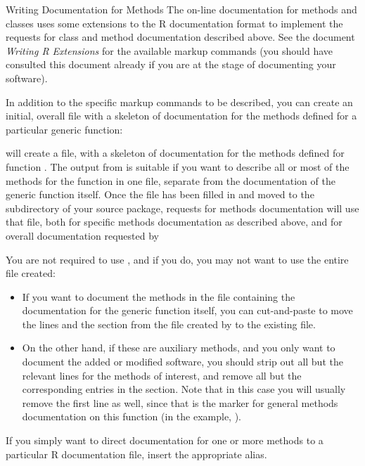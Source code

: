 \begin{Section}{Writing Documentation for Methods}
The on-line documentation for methods and classes uses some extensions
to the R documentation format to implement the requests for class and
method documentation described above.  See the document \emph{Writing
R Extensions} for the available markup commands (you should
have consulted this document already if you are at the stage of
documenting your software).

In addition to the specific markup commands to be described, you can
create an initial, overall file with a skeleton of documentation for
the methods defined for a particular generic function:


will create a file,  with a skeleton of
documentation for the methods defined for function .
The output from  is suitable if you want to
describe all or most of the methods for the function in one file,
separate from the documentation of the generic function itself.
Once the file has been filled in and moved to the 
subdirectory of your source package, requests for methods
documentation will use that file, both for specific methods
documentation as described above, and for overall documentation
requested by


You are not required to use , and if you do, you
may not want to use the entire file created:
\begin{itemize}

\item If you want to document the methods in the file containing the
documentation for the generic function itself, you can
cut-and-paste to move the  lines and the
 section from the file created by
 to the existing file.

\item On the other hand, if these are auxiliary methods, and you only
want to document the added or modified software, you should strip
out all but the relevant  lines for the methods of
interest, and remove all but the corresponding 
entries in the  section. Note that in this case you
will usually remove the first   line as well, since
that is the marker for general methods documentation on this
function (in the example, ).

\end{itemize}


If you simply want to direct documentation for one or more methods to
a particular R documentation file, insert the appropriate alias.
\end{Section}
